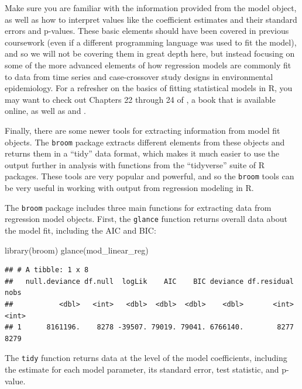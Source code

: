 \documentclass[
]{book}
\newenvironment{Shaded}{\begin{snugshade}}{\end{snugshade}}
\newcommand{\FunctionTok}[1]{\textcolor[rgb]{0.00,0.00,0.00}{#1}}
\newcommand{\NormalTok}[1]{#1}
\begin{document}
Make sure you are familiar with the information provided from the model object,
as well as how to interpret values like the coefficient estimates and their
standard errors and p-values. These basic elements should have been covered in
previous coursework (even if a different programming language was used to fit
the model), and so we will not be covering them in great depth here, but instead
focusing on some of the more advanced elements of how regression models are
commonly fit to data from time series and case-crossover study designs in
environmental epidemiology. For a refresher on the basics of fitting
statistical models in R, you may want to check out Chapters 22 through 24 of
\citet{wickham2016r}, a book that is available online, as well as \citet{dunn2018generalized1} and
\citet{james2013introduction3} .

Finally, there are some newer tools for extracting information from model fit
objects. The \texttt{broom} package extracts different elements from these objects
and returns them in a ``tidy'' data format, which makes it much easier to use
the output further in analysis with functions from the ``tidyverse'' suite of
R packages. These tools are very popular and powerful, and so the \texttt{broom} tools
can be very useful in working with output from regression modeling in R.

The \texttt{broom} package includes three main functions for extracting data from
regression model objects. First, the \texttt{glance} function returns overall data
about the model fit, including the AIC and BIC:

\begin{Shaded}
\begin{Highlighting}[]
\FunctionTok{library}\NormalTok{(broom)}
\FunctionTok{glance}\NormalTok{(mod\_linear\_reg)}
\end{Highlighting}
\end{Shaded}

\begin{verbatim}
## # A tibble: 1 x 8
##   null.deviance df.null  logLik    AIC    BIC deviance df.residual  nobs
##           <dbl>   <int>   <dbl>  <dbl>  <dbl>    <dbl>       <int> <int>
## 1      8161196.    8278 -39507. 79019. 79041. 6766140.        8277  8279
\end{verbatim}

The \texttt{tidy} function returns data at the level of the model coefficients,
including the estimate for each model parameter, its standard error, test
statistic, and p-value.
\end{document}
